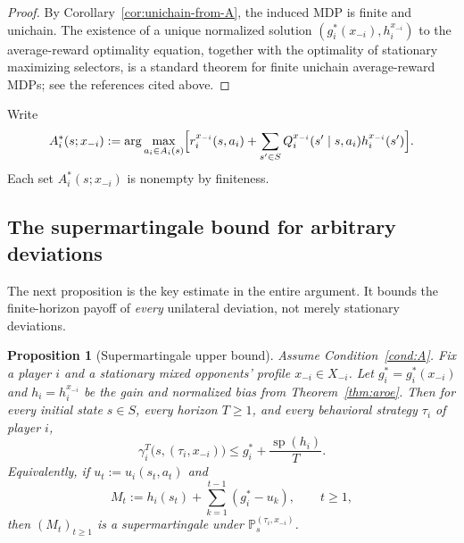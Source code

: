 \documentclass[11pt]{article}
\newtheorem{proposition}[theorem]{Proposition}
\theoremstyle{definition}
\newcommand{\Prob}{\mathbb{P}}
\newcommand{\1}{\mathbf{1}}
\DeclareMathOperator{\spn}{sp}
\begin{document}
\begin{proof}
By Corollary~\ref{cor:unichain-from-A}, the induced MDP is finite and unichain. The existence of a unique normalized solution $(g_i^*(x_{-i}),h_i^{x_{-i}})$ to the average-reward optimality equation, together with the optimality of stationary maximizing selectors, is a standard theorem for finite unichain average-reward MDPs; see the references cited above.
\end{proof}

Write
\[
A_i^*(s;x_{-i})
:=\arg\max_{a_i\in A_i(s)}\Bigl[r_i^{x_{-i}}(s,a_i)+\sum_{s'\in S}Q_i^{x_{-i}}(s'\mid s,a_i)h_i^{x_{-i}}(s')\Bigr].
\]
Each set $A_i^*(s;x_{-i})$ is nonempty by finiteness.

\subsection{The supermartingale bound for arbitrary deviations}

The next proposition is the key estimate in the entire argument. It bounds the finite-horizon payoff of \emph{every} unilateral deviation, not merely stationary deviations.

\begin{proposition}[Supermartingale upper bound]\label{prop:supermartingale}
Assume Condition~\ref{cond:A}. Fix a player $i$ and a stationary mixed opponents' profile $x_{-i}\in X_{-i}$. Let $g_i^*=g_i^*(x_{-i})$ and $h_i=h_i^{x_{-i}}$ be the gain and normalized bias from Theorem~\ref{thm:aroe}. Then for every initial state $s\in S$, every horizon $T\ge1$, and every behavioral strategy $\tau_i$ of player $i$,
\begin{equation}\label{eq:deviation-upper}
\gamma_i^T\bigl(s,(\tau_i,x_{-i})\bigr)
\le g_i^*+\frac{\spn(h_i)}{T}.
\end{equation}
Equivalently, if $u_t:=u_i(s_t,a_t)$ and
\[
M_t:=h_i(s_t)+\sum_{k=1}^{t-1}(g_i^*-u_k),\qquad t\ge1,
\]
then $(M_t)_{t\ge1}$ is a supermartingale under $\Prob_s^{(\tau_i,x_{-i})}$.
\end{proposition}
\end{document}
